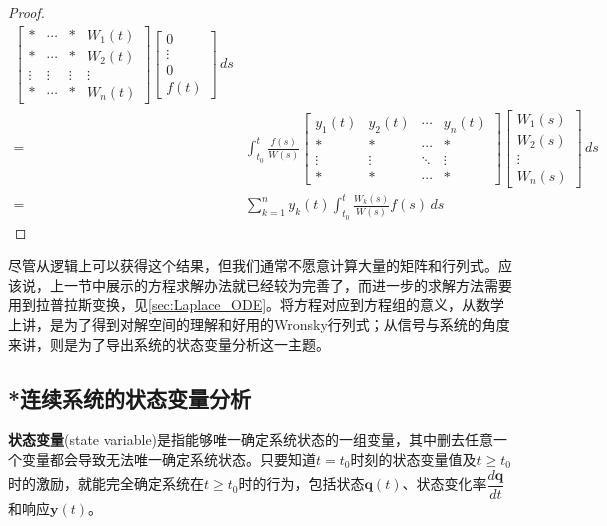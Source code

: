 \begin{proof}
\begin{align*}
\begin{bmatrix}
        * & \cdots & * & W_1(t)\\
        * &  \cdots & * & W_2(t)\\
        \vdots & \vdots & \vdots & \vdots\\
        * &  \cdots & * & W_n(t)
        \end{bmatrix}\begin{bmatrix}
        0\\
        \vdots\\
        0\\
        f(t)
        \end{bmatrix}\,ds\\
        =&\int_{t_0}^t \frac{f(s)}{W(s)}\begin{bmatrix}
        y_1(t) & y_2(t) & \cdots & y_n(t)\\
        * & * & \cdots & *\\
        \vdots & \vdots & \ddots & \vdots\\
        * & * & \cdots & *
        \end{bmatrix}\begin{bmatrix}
        W_1(s)\\
        W_2(s)\\
        \vdots\\
        W_n(s)
        \end{bmatrix}\,ds\\
        =&\sum_{k=1}^n y_k(t)\int_{t_0}^t \frac{W_k(s)}{W(s)}f(s)\,ds
    \end{align*}
\end{proof}
\begin{remark}
    尽管从逻辑上可以获得这个结果，但我们通常不愿意计算大量的矩阵和行列式。应该说，上一节中展示的方程求解办法就已经较为完善了，而进一步的求解方法需要用到拉普拉斯变换，见\ref{sec:Laplace_ODE}。将方程对应到方程组的意义，从数学上讲，是为了得到对解空间的理解和好用的Wronsky行列式；从信号与系统的角度来讲，则是为了导出系统的状态变量分析这一主题。
\end{remark}

\subsection{*连续系统的状态变量分析}\label{sub:state_variable_analysis}

\begin{definition}[状态变量]
    \textbf{状态变量}(state variable)是指能够唯一确定系统状态的一组变量，其中删去任意一个变量都会导致无法唯一确定系统状态。只要知道$t=t_0$时刻的状态变量值及$t\geq t_0$时的激励，就能完全确定系统在$t\geq t_0$时的行为，包括状态$\mathbf{q}(t)$、状态变化率$\dfrac{d\mathbf{q}}{dt}$和响应$\mathbf{y}(t)$。
\end{definition}

